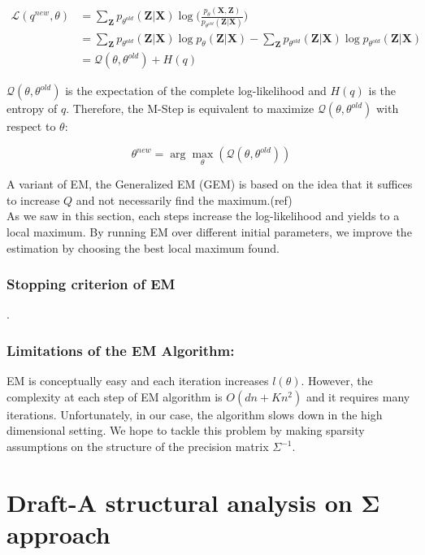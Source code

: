 \documentclass[12pt]{article}
\def\bSigma{\boldsymbol\Sigma}
\def\bX{\boldsymbol X}
\def\bZ{\boldsymbol Z}
\newcommand{\argmax}{\arg\!\max}
\begin{document}
\begin{align}
\mathcal{L}(q^{new},\theta)&=\sum_{\bZ}p_{\theta^{old}}(\bZ|\bX)\log\Big(\frac{p_{\theta}(\bX,\bZ)}{p_{\theta^{old}}(\bZ|\bX)}\Big)\\
&=\sum_{\bZ}p_{\theta^{old}}(\bZ|\bX)\log p_{\theta}(\bZ|\bX) - \sum_{\bZ}p_{\theta^{old}}(\bZ|\bX)\log p_{\theta^{old}}(\bZ|\bX)\\
&=\mathcal{Q}(\theta,\theta^{old})+H(q)
\end{align}

$\mathcal{Q}(\theta,\theta^{old})$ is the expectation of the complete log-likelihood and $H(q)$ is the entropy of $q$. Therefore, the M-Step is equivalent to maximize $\mathcal{Q}(\theta,\theta^{old})$ with respect to $\theta$:

\begin{equation}
  \theta^{new}=\argmax_{\theta}(\mathcal{Q}(\theta,\theta^{old}))
\end{equation}

A variant of EM, the Generalized EM (GEM) is based on the idea that it suffices to increase $Q$ and not necessarily find the maximum.(ref)\\

As we saw in this section, each steps increase the log-likelihood and yields to a local maximum. By running EM over different initial parameters, we improve the estimation by choosing the best local maximum found.

\subsubsection{Stopping criterion of EM}
.
\subsubsection{Limitations of the EM Algorithm:}

EM is conceptually easy and each iteration increases $l(\theta)$. However, the complexity at each step of EM algorithm is $O(dn+Kn^2)$ and it requires many iterations. Unfortunately, in our case, the algorithm slows down in the high dimensional setting. We hope to tackle this problem by making sparsity assumptions on the structure of the precision matrix $\Sigma^{-1}$.

\section{Draft-A structural analysis on $\bSigma$ approach}
\end{document}
